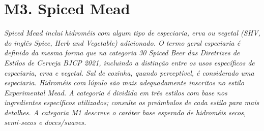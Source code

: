 \section*{M3. Spiced Mead}

\textit{Spiced Mead inclui hidroméis com algum tipo de especiaria, erva ou vegetal (SHV, do inglês \textit{Spice, Herb and Vegetable}) adicionado. O termo geral especiaria é definido da mesma forma que na categoria 30 Spiced Beer das Diretrizes de Estilos de Cerveja BJCP 2021, incluindo a distinção entre os usos específicos de especiaria, erva e vegetal. Sal de cozinha, quando perceptível, é considerado uma especiaria. Hidroméis com lúpulo são mais adequadamente inscritos no estilo Experimental Mead. A categoria é dividida em três estilos com base nos ingredientes específicos utilizados; consulte os preâmbulos de cada estilo para mais detalhes. A categoria M1 descreve o caráter base esperado de hidroméis secos, semi-secos e doces/suaves.}